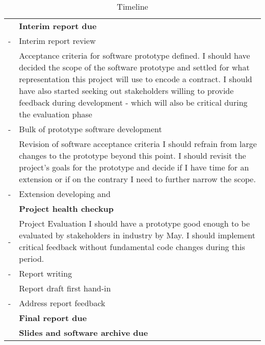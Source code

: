 \newcommand{\para}{\newline\newline}

\renewcommand\arraystretch{1.5}
\captionsetup{font=blue, labelfont=sc, labelsep=quad}
\begin{longtable}{@{\,}r <{\hskip 2pt} !{\foo} >{\raggedright\arraybackslash}p{7cm}}
    \caption{Timeline} \\[-1.5ex]
    \toprule
    \addlinespace[1.5ex]
                        & \textbf{Interim report due}              \\
    - & Interim report review                    \\

     & Acceptance criteria for software prototype defined.\para
    I should have decided the scope of the software prototype and settled for what
    representation this project will use to encode a contract. \newline
    I should have also started seeking out stakeholders willing to provide feedback during
    development - which will also be critical during the evaluation phase \\

    - & Bulk of prototype software development   \\

     & Revision of software acceptance criteria \para
    I should refrain from large changes to the prototype beyond this point.
    I should revisit the project's goals for the prototype and decide if I have time for an extension
    or if on the contrary I need to further narrow the scope. \\
    - & Extension developing and                 \\

                        & \textbf{Project health checkup}          \\
    - & Project Evaluation \para
    I should have a prototype good enough to be evaluated by stakeholders in industry by May.
    I should implement critical feedback without fundamental code changes during this period. \\
    - & Report writing                           \\
                        & Report draft first hand-in               \\
    - & Address report feedback                  \\
                        & \textbf{Final report due}                \\
                        & \textbf{Slides and software archive due} \\
\end{longtable}

